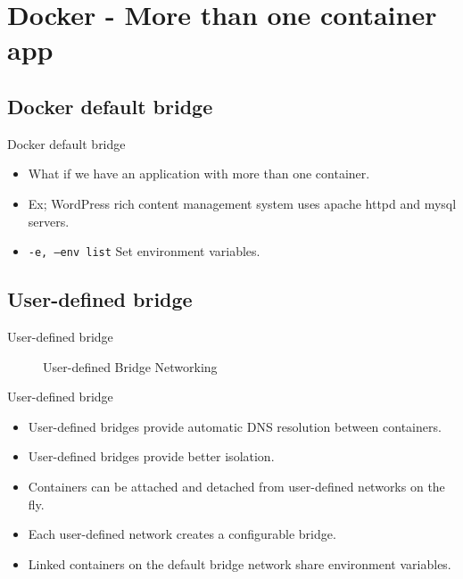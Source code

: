 
\section{Docker - More than one container app}\label{sec:more-than-one-container-app}

\subsection{Docker default bridge}\label{subsec:docker-default-bridge}
\begin{frame}{Docker default bridge}
    \begin{itemize}
        \item What if we have an application with more than one container.
        \pause
        \item Ex; WordPress rich content management system uses apache httpd and mysql servers.
        \pause
        \item \texttt{-e, --env list} Set environment variables.
        \pause
        
    \end{itemize}
\end{frame}

\subsection{User-defined bridge}\label{subsec:user-defined-bridge}
\begin{frame}{User-defined bridge}
    \begin{figure}[!t]
        \raggedright
        
        \caption{User-defined Bridge Networking}
    \end{figure}
\end{frame}
\begin{frame}{User-defined bridge}
    \begin{itemize}
        \item User-defined bridges provide automatic DNS resolution between containers.
        \pause
        \item User-defined bridges provide better isolation.
        \pause
        \item Containers can be attached and detached from user-defined networks on the fly.
        \pause
        \item Each user-defined network creates a configurable bridge.
        \pause
        \item Linked containers on the default bridge network share environment variables.
    \end{itemize}
\end{frame}

